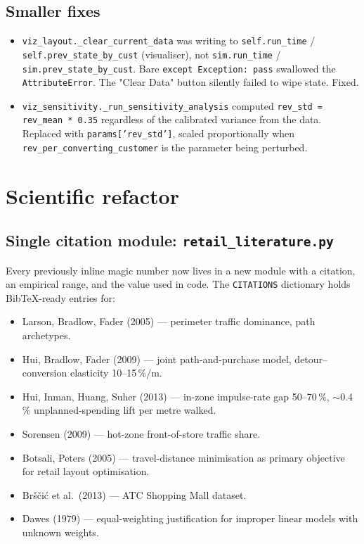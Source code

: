 \documentclass[11pt]{article}
\begin{document}
\subsection{Smaller fixes}
\begin{itemize}[leftmargin=*]
  \item \texttt{viz\_layout.\_clear\_current\_data} was writing to
    \texttt{self.run\_time} / \texttt{self.prev\_state\_by\_cust} (visualiser),
    not \texttt{sim.run\_time} / \texttt{sim.prev\_state\_by\_cust}.
    Bare \texttt{except Exception: pass} swallowed the
    \texttt{AttributeError}. The "Clear Data" button silently failed
    to wipe state. Fixed.
  \item \texttt{viz\_sensitivity.\_run\_sensitivity\_analysis} computed
    \texttt{rev\_std = rev\_mean * 0.35} regardless of the calibrated
    variance from the data. Replaced with
    \texttt{params['rev\_std']}, scaled proportionally when
    \texttt{rev\_per\_converting\_customer} is the parameter being
    perturbed.
\end{itemize}

\section{Scientific refactor}
\label{sec:lit-module}

\subsection{Single citation module: \texttt{retail\_literature.py}}

Every previously inline magic number now lives in a new module with a
citation, an empirical range, and the value used in code. The
\texttt{CITATIONS} dictionary holds BibTeX-ready entries for:
\begin{itemize}[leftmargin=*]
  \item Larson, Bradlow, Fader (2005) --- perimeter traffic dominance,
    path archetypes.
  \item Hui, Bradlow, Fader (2009) --- joint path-and-purchase model,
    detour--conversion elasticity 10--15\,\%/m.
  \item Hui, Inman, Huang, Suher (2013) --- in-zone impulse-rate gap
    50--70\,\%, $\sim$0.4\,\% unplanned-spending lift per metre walked.
  \item Sorensen (2009) --- hot-zone front-of-store traffic share.
  \item Botsali, Peters (2005) --- travel-distance minimisation as
    primary objective for retail layout optimisation.
  \item Bršči{\'c} et al.\ (2013) --- ATC Shopping Mall dataset.
  \item Dawes (1979) --- equal-weighting justification for improper
    linear models with unknown weights.
\end{itemize}
\end{document}
